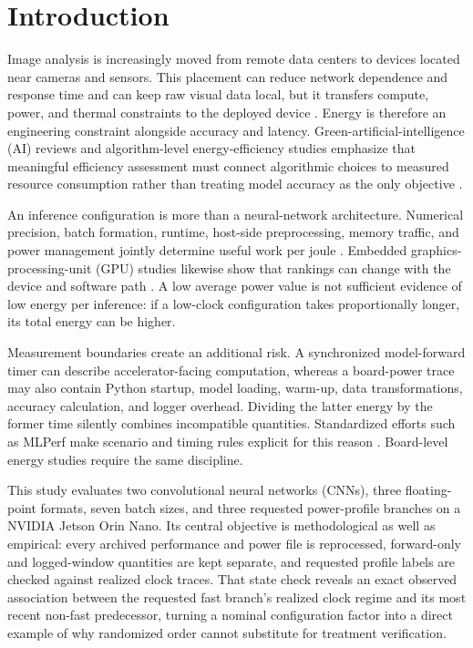 \documentclass[electronics,article,submit,pdftex,moreauthors]{Definitions/mdpi}
\newcommand{\jetson}{NVIDIA Jetson Orin Nano}
\begin{document}
\section{Introduction}

Image analysis is increasingly moved from remote data centers to devices located near cameras and sensors. This placement can reduce network dependence and response time and can keep raw visual data local, but it transfers compute, power, and thermal constraints to the deployed device \cite{koubaa2022cloud,rey2025drone}. Energy is therefore an engineering constraint alongside accuracy and latency. Green-artificial-intelligence (AI) reviews and algorithm-level energy-efficiency studies emphasize that meaningful efficiency assessment must connect algorithmic choices to measured resource consumption rather than treating model accuracy as the only objective \cite{bolon2024green,penev2024energy}.

An inference configuration is more than a neural-network architecture. Numerical precision, batch formation, runtime, host-side preprocessing, memory traffic, and power management jointly determine useful work per joule \cite{yang2017method,hodak2021recent}. Embedded graphics-processing-unit (GPU) studies likewise show that rankings can change with the device and software path \cite{jo2020benchmarking,suzen2020benchmark}. A low average power value is not sufficient evidence of low energy per inference: if a low-clock configuration takes proportionally longer, its total energy can be higher.

Measurement boundaries create an additional risk. A synchronized model-forward timer can describe accelerator-facing computation, whereas a board-power trace may also contain Python startup, model loading, warm-up, data transformations, accuracy calculation, and logger overhead. Dividing the latter energy by the former time silently combines incompatible quantities. Standardized efforts such as MLPerf make scenario and timing rules explicit for this reason \cite{reddi2020mlperf,banbury2021mlperf}. Board-level energy studies require the same discipline.

This study evaluates two convolutional neural networks (CNNs), three floating-point formats, seven batch sizes, and three requested power-profile branches on a \jetson{}. Its central objective is methodological as well as empirical: every archived performance and power file is reprocessed, forward-only and logged-window quantities are kept separate, and requested profile labels are checked against realized clock traces. That state check reveals an exact observed association between the requested fast branch's realized clock regime and its most recent non-fast predecessor, turning a nominal configuration factor into a direct example of why randomized order cannot substitute for treatment verification.
\end{document}

